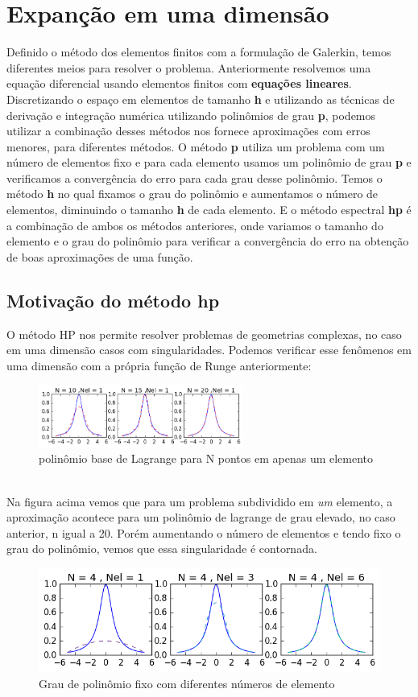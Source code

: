 \chapter{Expanção em uma dimensão}
 Definido o método dos elementos finitos com a formulação de Galerkin, temos diferentes meios para resolver o problema. Anteriormente resolvemos uma equação diferencial usando elementos finitos com \textbf{equações lineares}. Discretizando o espaço em elementos de tamanho \textbf{h} e utilizando as técnicas de derivação e integração numérica utilizando polinômios de grau \textbf{p}, podemos utilizar a combinação desses métodos nos fornece aproximações com erros menores, para diferentes métodos.
 O método \textbf{p} utiliza um problema com um número de elementos fixo e para cada elemento usamos um  polinômio de grau \textbf{p} e verificamos a convergência do erro para cada grau desse polinômio. Temos o método \textbf{h} no qual fixamos o grau do polinômio e aumentamos o número de elementos, diminuindo o tamanho \textbf{h} de cada elemento.
 E o método espectral \textbf{hp} é a combinação de ambos os métodos anteriores, onde variamos o tamanho do elemento e o grau do polinômio para verificar a convergência do erro na obtenção de boas aproximações de uma função. 
 \section{Motivação do método hp}
 O método HP nos permite resolver problemas de geometrias complexas, no caso em uma dimensão casos com singularidades. Podemos verificar esse fenômenos em uma dimensão com a própria função de Runge anteriormente:
\begin{figure}[!h]
\includegraphics[width=0.6\textwidth, center ]{figuras/compara_metodo_n.png}
\caption{polinômio base de Lagrange para N  pontos em apenas um elemento}
\end{figure}
\\ Na figura acima vemos que para um problema subdividido em \emph{um} elemento, a aproximação acontece para um polinômio de lagrange de grau elevado, no caso anterior, n igual a 20. Porém  aumentando o número de elementos e tendo fixo o grau do polinômio, vemos que essa singularidade é contornada.

\begin{figure}[!b]
\includegraphics[width=0.6 \textwidth, center]{figuras/compara_metodo_n2.png}
\caption{Grau de polinômio fixo com diferentes números de elemento}
\end{figure}
\pagebreak
